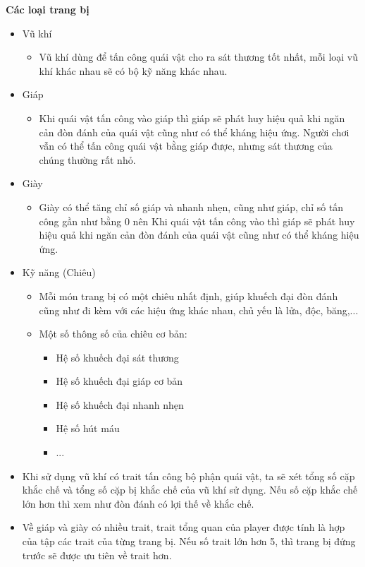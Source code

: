 \textbf{Các loại trang bị}
\begin{itemize}
	\item Vũ khí
	\begin{itemize}
		\item Vũ khí dùng để tấn công quái vật cho ra sát thương tốt nhất, mỗi loại vũ khí khác nhau sẽ có bộ kỹ năng khác nhau.
	\end{itemize}
	\item Giáp
	\begin{itemize}
		\item Khi quái vật tấn công vào giáp thì giáp sẽ phát huy hiệu quả khi ngăn cản đòn đánh của quái vật cũng như có thể kháng hiệu ứng. Người chơi vẫn có thể tấn công quái vật bằng giáp được, nhưng sát thương của chúng thường rất nhỏ.
	\end{itemize}
	\item Giày
	\begin{itemize}
		\item Giày có thể tăng chỉ số giáp và nhanh nhẹn, cũng như giáp, chỉ số tấn công gần như bằng 0 nên Khi quái vật tấn công vào thì giáp sẽ phát huy hiệu quả khi ngăn cản đòn đánh của quái vật cũng như có thể kháng hiệu ứng.
	\end{itemize}
	\item Kỹ năng (Chiêu)
	\begin{itemize}
		\item Mỗi món trang bị có một chiêu nhất định, giúp khuếch đại đòn đánh cũng như đi kèm với các hiệu ứng khác nhau, chủ yếu là lửa, độc, băng,...
		\item Một số thông số của chiêu cơ bản:
		\begin{itemize}
			\item Hệ số khuếch đại sát thương
			\item Hệ số khuếch đại giáp cơ bản
			\item Hệ số khuếch đại nhanh nhẹn
			\item Hệ số hút máu
			\item ...
		\end{itemize}
	\end{itemize}
	\item Khi sử dụng vũ khí có trait tấn công bộ phận quái vật, ta sẽ xét tổng số cặp khắc chế và tổng số cặp bị khắc chế của vũ khí sử dụng. Nếu số cặp khắc chế lớn hơn thì xem như đòn đánh có lợi thế về khắc chế.
	\item Về giáp và giày có nhiều trait, trait tổng quan của player được tính là hợp của tập các trait của từng trang bị. Nếu số trait lớn hơn 5, thì trang bị đứng trước sẽ được ưu tiên về trait hơn.
\end{itemize}
